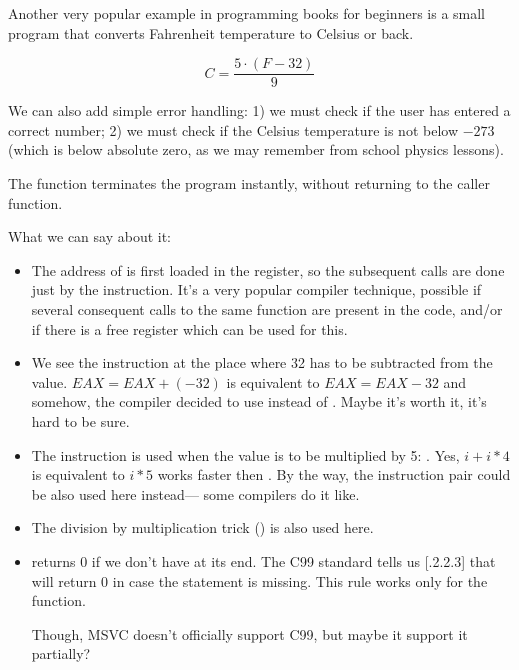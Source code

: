 
Another very popular example in 
programming books for beginners is a small program that converts Fahrenheit temperature to Celsius or back.

\[
	C=\frac{5 \cdot (F-32)}{9}
\]

We can also add simple error handling:
1) we must check if the user has entered a correct number;
2) we must check if the Celsius temperature is not below $-273$ 
(which is below absolute zero, as we may remember from school physics lessons).

The  function terminates 
the program instantly, without returning to the \gls{caller} function.







What we can say about it:

\begin{itemize}
\item The address of \printf is first loaded in the 
\ESI register, so the subsequent
\printf calls are done just by the  instruction.
It's a very popular compiler 
technique, possible if several consequent calls to the same function are present
in the code, and/or if there is a free register which can be used for this.

\item We see the  
instruction at the place where 32 has to be subtracted from the value.
$EAX=EAX+(-32)$ is equivalent to $EAX=EAX-32$ 
and somehow, the compiler decided to use  instead of .
Maybe it's worth it, it's hard to be sure.

\item The \LEA instruction is used when 
the value is to be multiplied by 5: .
Yes, $i+i*4$ is equivalent to $i*5$ \AndENRU \LEA 
works faster then .
By the way, the  instruction pair could be also used here instead---
some compilers do it like.

\item The division by multiplication trick () 
is also used here.

\item \main returns 0 if we don't have  
at its end.
The C99 standard tells us [.2.2.3] that \main 
will return 0 in case the 
 statement is missing.
This rule works only for the \main function.

Though, MSVC doesn't officially support C99, but maybe it support it partially?
\end{itemize}

